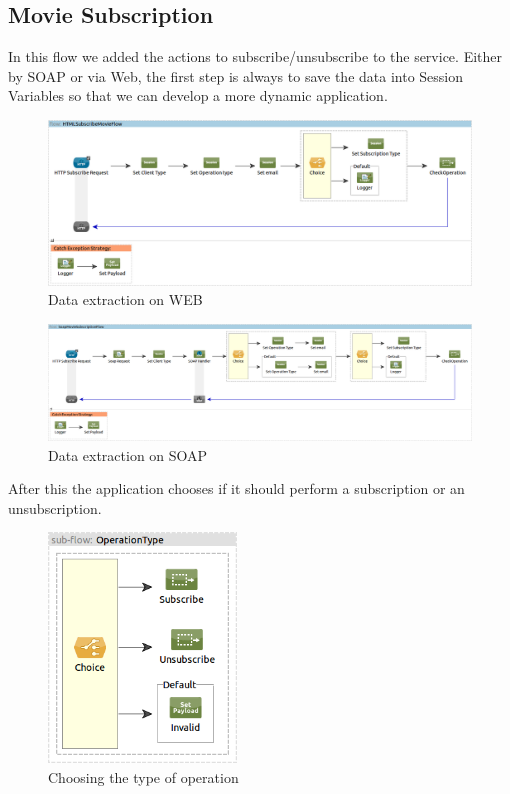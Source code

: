 \documentclass[12pt]{article}
\begin{document}
\subsection{Movie Subscription}
\indent In this flow we added the actions to subscribe/unsubscribe to the service. Either by SOAP or via Web, the first step is always to save the data into Session Variables so that we can develop a more dynamic application.

\begin{figure}[h!]
	\centering
	\includegraphics[width=\textwidth]{HTMLSubscribeMovieFlow.png}
	\caption{Data extraction on WEB}
\end{figure}
\begin{figure}[h!]
	\centering
	\includegraphics[width=\textwidth]{SoapMovieSubscriptionFlow.png}
	\caption{Data extraction on SOAP}
\end{figure}
\clearpage

After this the application chooses if it should perform a subscription or an unsubscription.

\begin{figure}[h!]
	\centering
	\includegraphics[width=5cm]{OperationType.png}
	\caption{Choosing the type of operation}
\end{figure}
\end{document}
